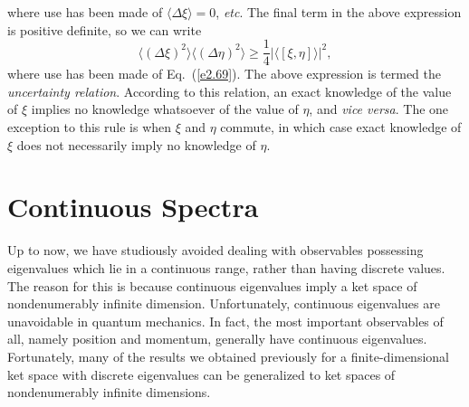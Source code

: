 where use has been made of $\langle \Delta\xi\rangle = 0$, {\em etc}.
The final term in the above expression is positive definite, so we can write
\begin{equation}\label{e2.75}
\langle (\Delta \xi)^2\rangle \langle (\Delta \eta)^2\rangle \geq \frac{1}{4} 
|\langle\left[ \xi,  \eta\right]\rangle|^2,
\end{equation}
where use has been made of Eq.~(\ref{e2.69}). The above expression is termed the
{\em uncertainty relation}. According to this relation, an exact knowledge
of the value of $\xi$ implies no knowledge whatsoever of the value of $\eta$,
and {\em vice versa}. The one exception to this rule is when $\xi$ and $\eta$
commute, in which case exact knowledge of $\xi$ does not necessarily imply
no knowledge of $\eta$. 

\section{Continuous Spectra}
Up to now, we have studiously avoided dealing with observables  possessing
eigenvalues which lie in a continuous range, rather than having discrete
values. The reason for this is because continuous eigenvalues imply a
ket space of  nondenumerably infinite dimension. Unfortunately, continuous
eigenvalues are unavoidable in quantum mechanics. In fact, the most important
observables of all, namely position and momentum, generally have continuous
eigenvalues. Fortunately, many of the results we obtained previously
for a finite-dimensional ket space with discrete eigenvalues can be
generalized to ket spaces of nondenumerably infinite dimensions.


